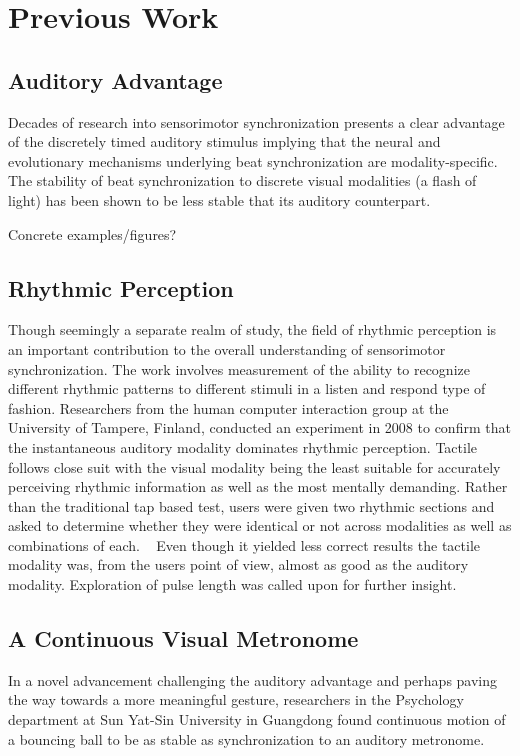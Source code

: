 \chapter{Previous Work}

\section{Auditory Advantage} \label{AudAdv}
Decades of research into sensorimotor synchronization presents a clear advantage of the discretely timed auditory stimulus implying that the neural and evolutionary mechanisms underlying beat synchronization are modality-specific.
~\cite{gan2015synchronization} The stability of beat synchronization to discrete visual modalities (a flash of light) has been shown to be less stable that its auditory counterpart.

Concrete examples/figures?

\section{Rhythmic Perception}
Though seemingly a separate realm of study, the field of rhythmic perception is an important contribution to the overall understanding of sensorimotor synchronization. The work involves measurement of the ability to recognize different rhythmic patterns to different stimuli in a listen and respond type of fashion. Researchers from the human computer interaction group at the University of Tampere, Finland, conducted an experiment in 2008 to confirm that the instantaneous auditory modality dominates rhythmic perception. Tactile follows close suit with the visual modality being the least suitable for accurately perceiving rhythmic information as well as the most mentally demanding. Rather than the traditional tap based test, users were given two rhythmic sections and asked to determine whether they were identical or not across modalities as well as combinations of each. ~\cite{jokiniemi2008crossmodal} Even though it yielded less correct results the tactile modality was, from the users point of view, almost as good as the auditory modality. Exploration of pulse length was called upon for further insight.

\section{A Continuous Visual Metronome} \label{visualMet}
In a novel advancement challenging the auditory advantage and perhaps paving the way towards a more meaningful gesture, researchers in the Psychology department at Sun Yat-Sin University in Guangdong found continuous motion of a bouncing ball to be as stable as synchronization to an auditory metronome.
~\cite{gan2015synchronization}


